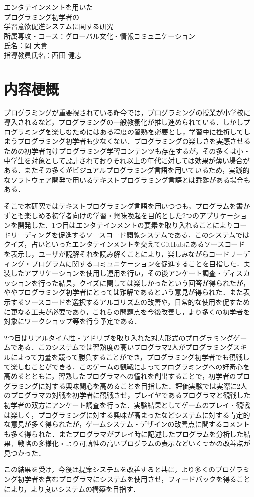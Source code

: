 \begin{center}
  {\Large エンタテインメントを用いた\\プログラミング初学者の\\学習意欲促進システムに関する研究}\\
  \vspace{20truept}
    所属専攻・コース：グローバル文化・情報コミュニケーション\\
    氏名：岡 大貴\\
    指導教員氏名：西田 健志\\
\end{center}

\section*{内容梗概}

プログラミングが重要視されている昨今では，プログラミングの授業が小学校に導入されるなど，プログラミングの一般教養化が推し進められている．しかしプログラミングを楽しむためにはある程度の習熟を必要とし，学習中に挫折してしまうプログラミング初学者も少なくない．プログラミングの楽しさを実感させるための初学者向けプログラミング学習コンテンツも存在するが，その多くは小・中学生を対象として設計されておりそれ以上の年代に対しては効果が薄い場合がある．またその多くがビジュアルプログラミング言語を用いているため，実践的なソフトウェア開発で用いるテキストプログラミング言語とは乖離がある場合もある．

そこで本研究ではテキストプログラミング言語を用いつつも，プログラムを書かずとも楽しめる初学者向けの学習・興味喚起を目的とした2つのアプリケーションを開発した．1つ目はエンタテインメントの要素を取り入れることによりコードリーディングを促進するソースコード閲覧システムである．このシステムではクイズ，占いといったエンタテインメントを交えてGitHubにあるソースコードを表示し，ユーザが読解それを読み解くことにより，楽しみながらコードリーディング・プログラムに関するコミュニケーションを促進することを目指した．実装したアプリケーションを使用し運用を行い，その後アンケート調査・ディスカッションを行った結果，クイズに関しては楽しかったという回答が得られたが，ややプログラミング初学者にとっては難解であるという意見が得られた．また表示するソースコードを選択するアルゴリズムの改善や，日常的な使用を促すために更なる工夫が必要であり，これらの問題点を今後改善し，より多くの初学者を対象にワークショップ等を行う予定である．

2つ目はリアルタイム性・アドリブを取り入れた対人形式のプログラミングゲームである．このシステムでは習熟度の高いプログラマ2人がプログラミングスキルによって力量を競って勝負することができ，プログラミング初学者でも観戦して楽しむことができる．このゲームの観戦によってプログラミングへの好奇心を高めるとともに，習熟したプログラマへの憧れを創出することで，初学者のプログラミングに対する興味関心を高めることを目指した．評価実験では実際に2人のプログラマの対戦を初学者に観戦させ，プレイヤであるプログラマと観戦した初学者の双方にアンケート調査を行った．実験結果としてゲームのプレイ・観戦は楽しく，プログラミングに対する興味が高まったなどシステムに対する肯定的な意見が多く得られたが，ゲームシステム・デザインの改善点に関するコメントも多く得られた．またプログラマがプレイ時に記述したプログラムを分析した結果，戦略の多様化・より可読性の高いプログラムの表示などいくつかの改善点が見つかった．

この結果を受け，今後は提案システムを改善すると共に，より多くのプログラミング初学者を含むプログラマにシステムを使用させ，フィードバックを得ることにより，より良いシステムの構築を目指す．